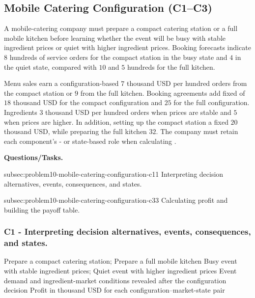 	\subsection{Mobile Catering Configuration (C1--C3)}
	\label{sec:problem10-mobile-catering-configuration-c1-c3}

	A mobile-catering company must prepare a compact catering station or a full mobile kitchen before learning whether the event will be busy with stable ingredient prices or quiet with higher ingredient prices. Booking forecasts indicate \(8\) hundreds of service orders for the compact station in the busy state and \(4\) in the quiet state, compared with \(10\) and \(5\) hundreds for the full kitchen.

	Menu sales earn a configuration-based \(7\) thousand USD per hundred orders from the compact station or \(9\) from the full kitchen. Booking agreements add fixed  of \(18\) thousand USD for the compact configuration and \(25\) for the full configuration. Ingredients  \(3\) thousand USD per hundred orders when prices are stable and \(5\) when prices are higher. In addition, setting up the compact station  a fixed \(20\) thousand USD, while preparing the full kitchen  \(32\). The company must retain each component's - or state-based role when calculating .

	\textbf{Questions/Tasks.}
	\begin{enumerate}
		\CriterionTask
		{subsec:problem10-mobile-catering-configuration-c1}{1}
		{Interpreting decision alternatives, events, consequences, and states.}

		\CriterionTask
		{subsec:problem10-mobile-catering-configuration-c3}{3}
		{Calculating profit and building the payoff table.}
	\end{enumerate}

	\subsubsection*{C1 - Interpreting decision alternatives, events, consequences, and states.}
	\label{subsec:problem10-mobile-catering-configuration-c1}

	\DecisionElementsTable
	{Prepare a compact catering station; Prepare a full mobile kitchen}
	{Busy event with stable ingredient prices; Quiet event with higher ingredient prices}
	{Event demand and ingredient-market conditions revealed after the configuration decision}
	{Profit in thousand USD for each configuration--market-state pair}

